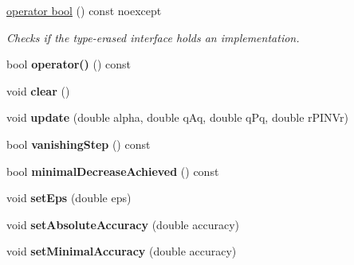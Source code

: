 \begin{DoxyCompactItemize}
\item 
\hyperlink{classSpacy_1_1CG_1_1TerminationCriterion_a527774f74e16fe94efa958e594c1be6d}{operator bool} () const noexcept
\begin{DoxyCompactList}\small\item\em Checks if the type-\/erased interface holds an implementation. \end{DoxyCompactList}\item 
bool {\bfseries operator()} () const \hypertarget{classSpacy_1_1CG_1_1TerminationCriterion_ab109eb287dd3622db54bbbdf0a55660a}{}\label{classSpacy_1_1CG_1_1TerminationCriterion_ab109eb287dd3622db54bbbdf0a55660a}

\item 
void {\bfseries clear} ()\hypertarget{classSpacy_1_1CG_1_1TerminationCriterion_a347651c14a38ce3bf1c92454aded97ab}{}\label{classSpacy_1_1CG_1_1TerminationCriterion_a347651c14a38ce3bf1c92454aded97ab}

\item 
void {\bfseries update} (double alpha, double q\+Aq, double q\+Pq, double r\+P\+I\+N\+Vr)\hypertarget{classSpacy_1_1CG_1_1TerminationCriterion_a4ef7ad43f594bab9b21f60e36697c516}{}\label{classSpacy_1_1CG_1_1TerminationCriterion_a4ef7ad43f594bab9b21f60e36697c516}

\item 
bool {\bfseries vanishing\+Step} () const \hypertarget{classSpacy_1_1CG_1_1TerminationCriterion_ab92b8e27edb8290ed34c34a242f900d3}{}\label{classSpacy_1_1CG_1_1TerminationCriterion_ab92b8e27edb8290ed34c34a242f900d3}

\item 
bool {\bfseries minimal\+Decrease\+Achieved} () const \hypertarget{classSpacy_1_1CG_1_1TerminationCriterion_a928da2a9183b773ca90477057b3d2b8b}{}\label{classSpacy_1_1CG_1_1TerminationCriterion_a928da2a9183b773ca90477057b3d2b8b}

\item 
void {\bfseries set\+Eps} (double eps)\hypertarget{classSpacy_1_1CG_1_1TerminationCriterion_a59099ba9af213a66a33bb5b7c7061e11}{}\label{classSpacy_1_1CG_1_1TerminationCriterion_a59099ba9af213a66a33bb5b7c7061e11}

\item 
void {\bfseries set\+Absolute\+Accuracy} (double accuracy)\hypertarget{classSpacy_1_1CG_1_1TerminationCriterion_a833711290bf75d7cf7450f163f537510}{}\label{classSpacy_1_1CG_1_1TerminationCriterion_a833711290bf75d7cf7450f163f537510}

\item 
void {\bfseries set\+Minimal\+Accuracy} (double accuracy)\hypertarget{classSpacy_1_1CG_1_1TerminationCriterion_a5e16822944d08001fde24212857f4b2a}{}\label{classSpacy_1_1CG_1_1TerminationCriterion_a5e16822944d08001fde24212857f4b2a}


\end{DoxyCompactItemize}
